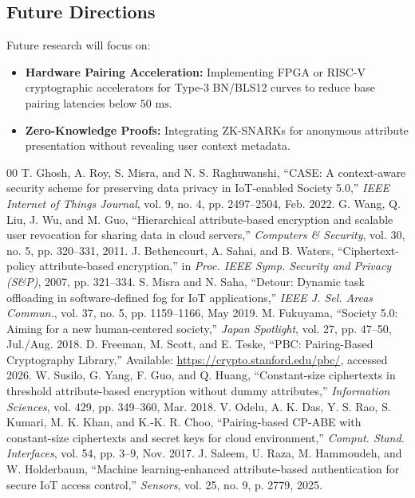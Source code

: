 \documentclass[conference]{IEEEtran}
\begin{document}
\subsection{Future Directions}
Future research will focus on:
\begin{itemize}
    \item \textbf{Hardware Pairing Acceleration:} Implementing FPGA or RISC-V cryptographic accelerators for Type-3 BN/BLS12 curves to reduce base pairing latencies below $50\text{ ms}$.
    \item \textbf{Zero-Knowledge Proofs:} Integrating ZK-SNARKs for anonymous attribute presentation without revealing user context metadata.
\end{itemize}

\balance
\begin{thebibliography}{00}
 T. Ghosh, A. Roy, S. Misra, and N. S. Raghuwanshi, ``CASE: A context-aware security scheme for preserving data privacy in IoT-enabled Society 5.0,'' \textit{IEEE Internet of Things Journal}, vol. 9, no. 4, pp. 2497--2504, Feb. 2022.
 G. Wang, Q. Liu, J. Wu, and M. Guo, ``Hierarchical attribute-based encryption and scalable user revocation for sharing data in cloud servers,'' \textit{Computers \& Security}, vol. 30, no. 5, pp. 320--331, 2011.
 J. Bethencourt, A. Sahai, and B. Waters, ``Ciphertext-policy attribute-based encryption,'' in \textit{Proc. IEEE Symp. Security and Privacy (S\&P)}, 2007, pp. 321--334.
 S. Misra and N. Saha, ``Detour: Dynamic task offloading in software-defined fog for IoT applications,'' \textit{IEEE J. Sel. Areas Commun.}, vol. 37, no. 5, pp. 1159--1166, May 2019.
 M. Fukuyama, ``Society 5.0: Aiming for a new human-centered society,'' \textit{Japan Spotlight}, vol. 27, pp. 47--50, Jul./Aug. 2018.
 D. Freeman, M. Scott, and E. Teske, ``PBC: Pairing-Based Cryptography Library,'' Available: \url{https://crypto.stanford.edu/pbc/}, accessed 2026.
 W. Susilo, G. Yang, F. Guo, and Q. Huang, ``Constant-size ciphertexts in threshold attribute-based encryption without dummy attributes,'' \textit{Information Sciences}, vol. 429, pp. 349--360, Mar. 2018.
 V. Odelu, A. K. Das, Y. S. Rao, S. Kumari, M. K. Khan, and K.-K. R. Choo, ``Pairing-based CP-ABE with constant-size ciphertexts and secret keys for cloud environment,'' \textit{Comput. Stand. Interfaces}, vol. 54, pp. 3--9, Nov. 2017.
 J. Saleem, U. Raza, M. Hammoudeh, and W. Holderbaum, ``Machine learning-enhanced attribute-based authentication for secure IoT access control,'' \textit{Sensors}, vol. 25, no. 9, p. 2779, 2025.

\end{thebibliography}
\end{document}
